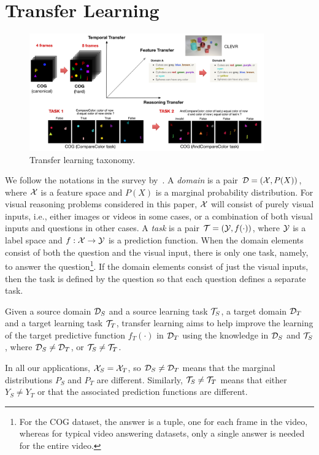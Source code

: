 \section{Transfer Learning}

\begin{figure}
	\centering
	\includegraphics[width=0.9\textwidth]{img/architecture/transfer_taxo}
	\caption{Transfer learning taxonomy.}\label{fig:taskonomy}
\end{figure}

We follow the notations in the survey by~\cite{pan2009survey}.
A \emph{domain} is a pair $\mathcal{D} = (\mathcal{X},P(X))$, where $\mathcal{X}$ is a feature space and $P(X)$ is a marginal probability distribution.
For visual reasoning problems considered in this paper, 
$\mathcal{X}$ will consist of purely visual inputs, i.e., either images or videos in some cases, or 
a combination of both visual inputs and questions in other cases. 
A \emph{task} is a pair $\mathcal{T}= (\mathcal{Y},f(\cdot))$, where $\mathcal{Y}$ is a label space and $f: \mathcal{X} \to \mathcal{Y}$ is a prediction function. 
When the domain elements consist of both the question and the visual input, there is only one task, namely, to answer the 
question\footnote{%
	For the COG dataset, the answer is a tuple, one for each frame in the video, whereas for typical video answering datasets,
	only a single answer is needed for the entire video.}. %
If the domain elements consist of just the visual inputs, then the task is defined by the question so that each question 
defines a separate task.\newline

\begin{definition}
	\label{defn:transfer}
	Given a source domain $\mathcal{D}_S$ and a source learning task $\mathcal{T}_S$, a target domain $\mathcal{D}_T$ and a target learning task $\mathcal{T}_T$, transfer learning aims to help improve the 
	learning of the target predictive function $f_T(\cdot)$ in $\mathcal{D}_T$ using the knowledge  in $\mathcal{D}_S$ and $\mathcal{T}_S$, where $\mathcal{D}_S \ne \mathcal{D}_T$, or $\mathcal{T}_S \ne \mathcal{T}_T$.
\end{definition}
In all our applications, $\mathcal{X}_S = \mathcal{X}_T$, so $\mathcal{D}_S \ne \mathcal{D}_T$ means that the marginal distributions $P_S$ and $P_T$ are different.
Similarly, $\mathcal{T}_S \ne \mathcal{T}_T$ means that either $Y_S \ne Y_T$ or that the associated prediction functions are different.

